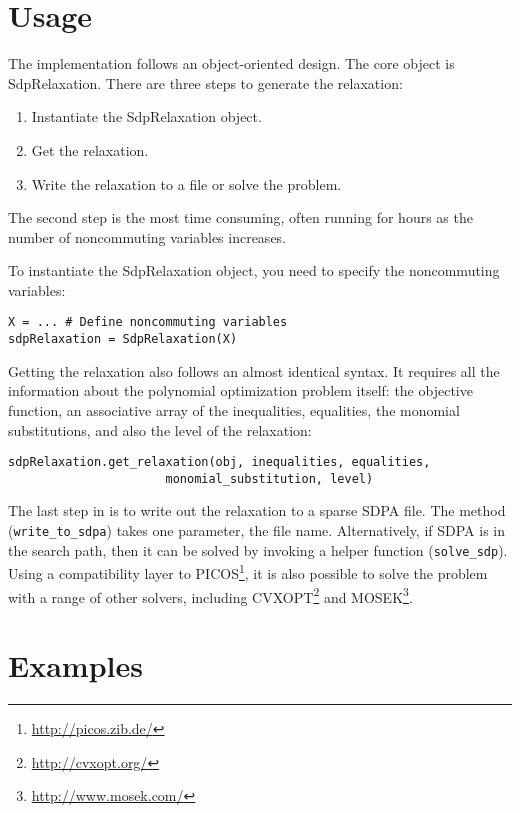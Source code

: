 \documentclass{article}
\begin{document}
\section{Usage}
The implementation follows an object-oriented design. The core object is SdpRelaxation. There are three steps to generate the relaxation:
\begin{enumerate}
  \item Instantiate the SdpRelaxation object.
  \item Get the relaxation.
  \item Write the relaxation to a file or solve the problem.
\end{enumerate}

The second step is the most time consuming, often running for hours as the number of noncommuting variables increases.

To instantiate the SdpRelaxation object, you need to specify the noncommuting variables:
\begin{verbatim}
X = ... # Define noncommuting variables
sdpRelaxation = SdpRelaxation(X)
\end{verbatim}

Getting the relaxation also follows an almost identical syntax. It requires all the information about the polynomial optimization problem itself: the objective function, an associative array of the inequalities, equalities, the monomial substitutions, and also the level of the relaxation:
\begin{verbatim}
sdpRelaxation.get_relaxation(obj, inequalities, equalities, 
                      monomial_substitution, level)
\end{verbatim}

The last step in is to write out the relaxation to a sparse SDPA file. The method (\verb+write_to_sdpa+) takes one parameter, the file name. Alternatively, if SDPA is in the search path, then it can be solved by invoking a helper function (\verb+solve_sdp+). Using a compatibility layer to PICOS\footnote{\url{http://picos.zib.de/}}, it is also possible to solve the problem with a range of other solvers, including CVXOPT\footnote{\url{http://cvxopt.org/}} and MOSEK\footnote{\url{http://www.mosek.com/}}.

\section{Examples}
\end{document}

